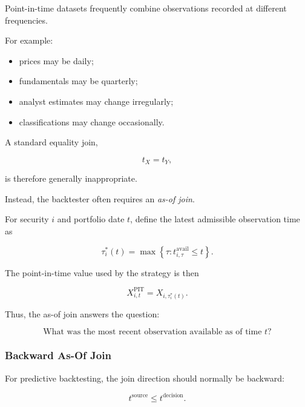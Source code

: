 \documentclass[11pt,a4paper]{article}
\begin{document}
Point-in-time datasets frequently combine observations recorded at different
frequencies.

For example:

\begin{itemize}
    \item prices may be daily;
    \item fundamentals may be quarterly;
    \item analyst estimates may change irregularly;
    \item classifications may change occasionally.
\end{itemize}

A standard equality join,

\begin{equation}
t_X=t_Y,
\end{equation}

is therefore generally inappropriate.

Instead, the backtester often requires an \emph{as-of join}.

For security $i$ and portfolio date $t$, define the latest admissible
observation time as

\begin{equation}
\boxed{
\tau_i^*(t)
=
\max
\left\{
\tau:
t_{i,\tau}^{\mathrm{avail}}
\leq
t
\right\}.
}
\end{equation}

The point-in-time value used by the strategy is then

\begin{equation}
\boxed{
X_{i,t}^{\mathrm{PIT}}
=
X_{i,\tau_i^*(t)}.
}
\end{equation}

Thus, the as-of join answers the question:

\begin{equation}
\boxed{
\text{What was the most recent observation available as of time }t?
}
\end{equation}


\subsubsection{Backward As-Of Join}

For predictive backtesting, the join direction should normally be backward:

\begin{equation}
\boxed{
t^{\mathrm{source}}
\leq
t^{\mathrm{decision}}.
}
\end{equation}
\end{document}
